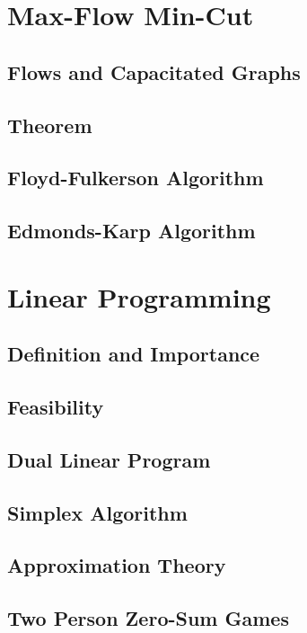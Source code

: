 \documentclass[11pt]{article}
\theoremstyle{plain}
\theoremstyle{definition}
\numberwithin{equation}{section}
\numberwithin{figure}{section}
\begin{document}
\newpage
\section{Max-Flow Min-Cut}

\subsection{Flows and Capacitated Graphs}

\subsection{Theorem}

\subsection{Floyd-Fulkerson Algorithm}

\subsection{Edmonds-Karp Algorithm}

\newpage
\section{Linear Programming}

\subsection{Definition and Importance}

\subsection{Feasibility}

\subsection{Dual Linear Program}

\subsection{Simplex Algorithm}

\subsection{Approximation Theory}

\subsection{Two Person Zero-Sum Games}
\end{document}
